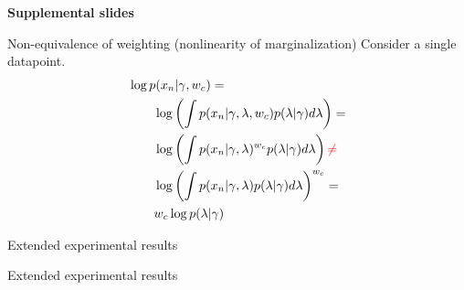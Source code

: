 
\begin{frame}
\begin{center}
\textbf{\Large Supplemental slides}
\end{center}
\end{frame}


\begin{frame}{Non-equivalence of weighting (nonlinearity of marginalization)}
%
Consider a single datapoint.
%
\begin{align*}
%
\MoveEqLeft
\log \p(\x_n \vert \gamma, \w_c)
=\\&
\log \left( \int \p(\x_n \vert \gamma, \lambda, \w_c)
    \p(\lambda \vert \gamma) d\lambda \right)
=\\&
\log \left( \int \p(\x_n \vert \gamma, \lambda)^{\w_c}
    \p(\lambda \vert \gamma) d\lambda \right)
\red{\ne}\\&
\log \left( \int \p(\x_n \vert \gamma, \lambda)
    \p(\lambda \vert \gamma) d\lambda \right)^{\w_c}
=\\&
\w_c \log \p(\lambda \vert \gamma)
%
\end{align*}
%
\end{frame}


\begin{frame}{Extended experimental results}
    \ManyPlotsOne{}
\end{frame}


\begin{frame}{Extended experimental results}
    \ManyPlotsTwo{}
\end{frame}
